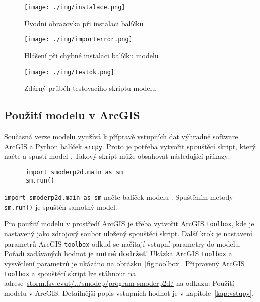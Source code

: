   \begin{figure}[t!]
    \centering
    \texttt{[image: ./img/instalace.png]}
    \caption{Úvodní obrazovka při instalaci balíčku \smod}
    \label{fig:pruvodce}
  \end{figure}
% 
  \begin{figure}[b!]
    \centering
    \texttt{[image: ./img/importerror.png]}
    \caption{Hlášení při chybné instalaci balíčku modelu \smod}
    \label{fig:importerror}
  \end{figure}
% 
  \begin{figure}[t!]
    \centering
    \texttt{[image: ./img/testok.png]}
    \caption{Zdárný průběh testovacího skriptu modelu}
    \label{fig:testok}
  \end{figure}
  
\subsection{Použití modelu v ArcGIS}
  
  Současná verze modelu \smod využívá k přípravě vstupních dat výhradně software ArcGIS a Python balíček {\tt arcpy}. Proto je potřeba vytvořit spouštěcí skript, který načte a spustí model \smod. Takový skript může obsahovat následující příkazy:
    \begin{lstlisting}
      import smoderp2d.main as sm
      sm.run()
    \end{lstlisting}
  {\tt import smoderp2d.main as sm}  načte balíček modelu \smod. Spuštěním metody  {\tt sm.run()} je spuštěn samotný model. 
  
  Pro použití modelu v prostředí ArcGIS je třeba vytvořit ArcGIS {\tt toolbox}, kde je nastavený jako zdrojový soubor  uložený spouštěcí skript. Další krok je nastavení parametrů ArcGIS {\tt toolbox} odkud se načítají vstupní parametry do modelu. Pořadí zadávaných hodnot je {\bf nutné dodržet}! Ukázka ArcGIS {\tt toolbox} a vysvětlení parametrů je ukázáno na obrázku~\ref{fig:toolbox}. Připravený ArcGIS {\tt toolbox} a spouštěcí skript lze stáhnout na adrese~\href{http://storm.fsv.cvut.cz/cinnost-katedry/volne-stazitelne-vysledky/smoderp/program-smoderp2d/}{storm.fsv.cvut/../smodep/program-smoderp2d/} na odkazu: Použití modelu v ArcGIS. Detailnější popis vstupních hodnot je v kapitole~\ref{kap:vstupy}.
  
